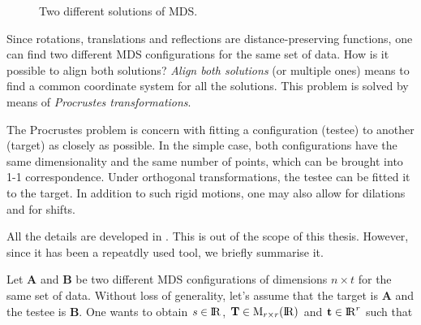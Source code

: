 \documentclass[11pt]{report}
\begin{document}
\begin{figure}[ht]
    \centering
    \qquad
    \caption{Two different solutions of MDS.}%
    \label{twosol}%
\end{figure}


\indent Since rotations, translations and reflections are distance-preserving 
functions, one can find two different MDS configurations 
for the same set of data. How is it possible to align both solutions? 
\textit{Align both solutions} (or multiple ones) means to find a common 
coordinate system for all the solutions. This problem is solved by means 
of \textit{Procrustes transformations}.  


\indent The Procrustes problem is concern with fitting a configuration (testee)
to another (target) as closely as possible. In the simple case, both 
configurations have the same dimensionality and the same number of points, which
can be brought into 1-1 correspondence. Under orthogonal transformations, 
the testee can be fitted it to the target. In addition to such rigid motions, 
one may also allow for dilations and for shifts.

\indent All the details are developed in  . This is out 
of the scope of this thesis. However, since it has been a repeatdly used tool, 
we briefly summarise it. 

\indent Let \textbf{A} and \textbf{B} be two different MDS configurations 
of dimensions $n \times t$ for the same set of data. Without loss of generality, 
let's assume that the target is \textbf{A} and the testee is \textbf{B}. 
One wants to obtain $s \in {\rm I\!R}$, 
$\mathbf{T} \in \mbox{M}_{r\times r}({\rm I\!R})$ and 
$\mathbf{t} \in {\rm I\!R}^r$ such that
\end{document}

